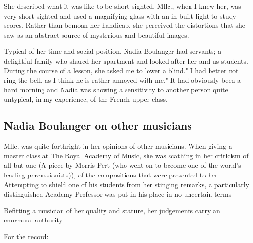 \documentclass{article}
\begin{document}
She described what it was like to be short sighted.
Mlle., when I knew her, was very short sighted and used a magnifying glass with an in-built light to study scores.
Rather than bemoan her handicap, she perceived the distortions that she saw as an abstract source of mysterious and beautiful images.

Typical of her time and social position, Nadia Boulanger had servants; a delightful family who shared her apartment and looked after her and us students.
During the course of a lesson, she asked me to lower a blind."
I had better not ring the bell, as I think he is rather annoyed with me."
It had obviously been a hard morning and Nadia was showing a sensitivity to another person quite untypical, in my experience, of the French upper class.

\subsection{Nadia Boulanger on other musicians}

Mlle. was quite forthright in her opinions of other musicians.
When giving a master class at The Royal Academy of Music, she was scathing in her criticism of all but one (A piece by Morris Pert (who went on to become one of the world's leading percussionists)),  of the compositions that were presented to her.
Attempting to shield one of his students from her stinging remarks, a particularly distinguished Academy Professor was put in his place in no uncertain terms.

Befitting a musician of her quality and stature, her judgements carry an enormous authority.

For the record:\\
\end{document}
